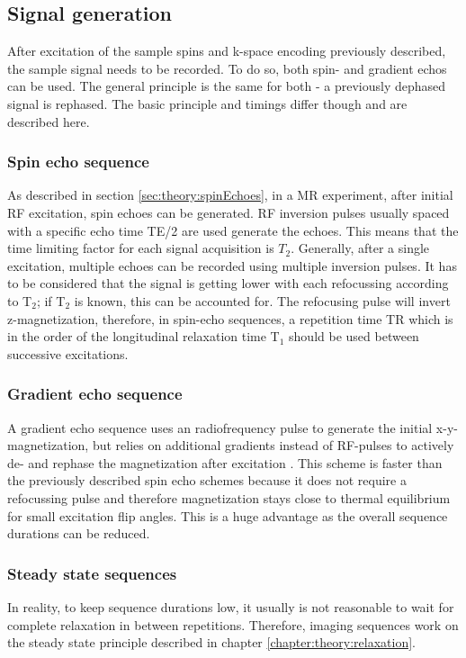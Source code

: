         \subsection{Signal generation}
        After excitation of the sample spins and k-space encoding previously described, the sample signal needs to be recorded. To do so, both spin- and gradient echos can be used. The general principle is the same for both - a previously dephased signal is rephased. The basic principle and timings differ though and are described here. 
        \subsubsection{Spin echo sequence}
            As described in section \ref{sec:theory:spinEchoes}, in a MR experiment, after initial RF excitation, spin echoes can be generated. RF inversion pulses usually spaced with a specific echo time TE/2 are used generate the echoes. This means that the time limiting factor for each signal acquisition is $T_2$. Generally, after a single excitation, multiple echoes can be recorded using multiple inversion pulses. It has to be considered that the signal is getting lower with each refocussing according to T$_2$; if T$_2$ is known, this can be accounted for. The refocusing pulse will invert z-magnetization, therefore, in spin-echo sequences, a repetition time TR which is in the order of the longitudinal relaxation time T$_1$ should be used between successive excitations.
        \subsubsection{Gradient echo sequence}
        \label{sec:theory:gradientEcho}
        A gradient echo sequence uses an radiofrequency pulse to generate the initial x-y-magnetization, but relies on additional gradients instead of RF-pulses to actively de- and rephase the magnetization after excitation \cite{brown_mri_2005}. This scheme is faster than the previously described spin echo schemes because it does not require a refocussing pulse and therefore magnetization stays close to thermal equilibrium for small excitation flip angles. This is a huge advantage as the overall sequence durations can be reduced.
        \subsubsection{Steady state sequences}
        In reality, to keep sequence durations low, it usually is not reasonable to wait for complete relaxation in between repetitions. Therefore, imaging sequences work on the steady state principle described in chapter \ref{chapter:theory:relaxation}.
